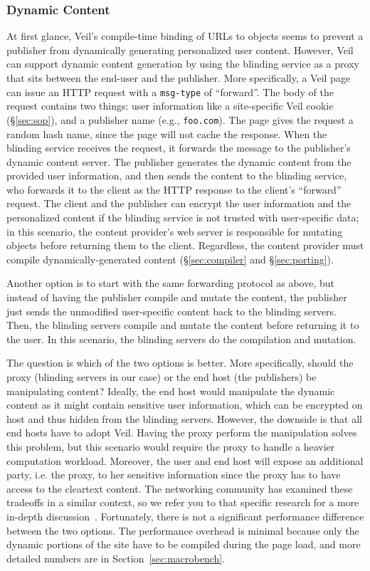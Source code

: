 \subsubsection{Dynamic Content}
\label{sec:dynamic}

At first glance, Veil's compile-time binding of
URLs to objects seems to prevent a publisher
from dynamically generating personalized user
content. However, Veil can support dynamic
content generation by using the blinding
service as a proxy that sits between the
end-user and the publisher. More specifically,
a Veil page can issue an HTTP request with
a \texttt{msg-type} of ``forward''. The body
of the request contains two things: user information
like a site-specific Veil cookie (\S\ref{sec:sop}),
and a publisher name (e.g., \texttt{foo.com}).
The page gives the request a random hash name,
since the page will not cache the response.
When the blinding service receives the request,
it forwards the message to the publisher's
dynamic content server. The publisher generates
the dynamic content from the provided user
information, and then sends the content to the
blinding service, who forwards it to the client
as the HTTP response to the client's ``forward''
request. The client and the publisher can encrypt
the user information and the personalized content
if the blinding service is not trusted with
user-specific data; in this scenario, the content provider's web server
is responsible for mutating objects before returning
them to the client. Regardless, the content provider
must compile dynamically-generated content (\S\ref{sec:compiler}
and \S\ref{sec:porting}).

Another option is to start with the same forwarding
protocol as above, but instead of having
the publisher compile and mutate the content, the 
publisher just sends the unmodified user-specific
content back to the blinding servers. Then, the blinding
servers compile and mutate the content before
returning it to the user. In this scenario, the blinding
servers do the compilation and mutation. 

The question is which of the two options is better. 
More specifically, should the proxy (blinding servers
in our case) or the end host (the publishers) be 
manipulating content?
Ideally, the end host
would manipulate the dynamic content as it might
contain sensitive user information, which can be 
encrypted on host and thus hidden from the blinding servers.
However, the downside is that all end hosts have to 
adopt Veil. Having the proxy perform the manipulation
solves this problem, but this scenario would
require the proxy to handle a heavier computation workload.
Moreover, the user and end host will expose an additional party, i.e. 
the proxy, to her sensitive information since the
proxy has to have access to the cleartext content.
The networking community
has examined these tradeoffs in a similar context, 
so we refer you to that specific research for a more in-depth
discussion~\cite{flywheel,polaris}.
Fortunately, there is not a significant
performance difference between the two options. 
The performance overhead is minimal because only the dynamic
portions of the site have to be compiled during the page load, 
and more detailed numbers are in Section~\ref{sec:macrobench}.

